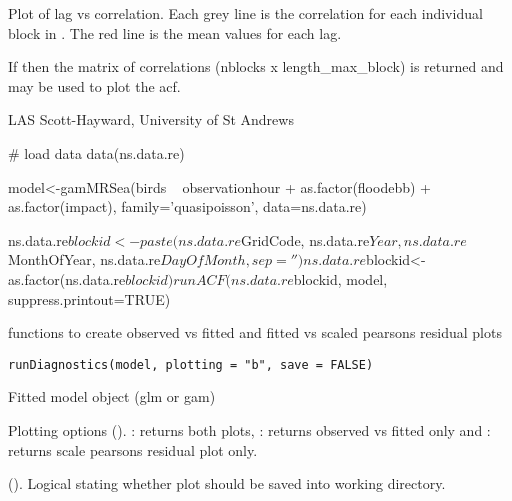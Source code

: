 \documentclass[a4paper]{book}
\begin{document}
%
\begin{Value}
Plot of lag vs correlation.  Each grey line is the correlation for each individual block in .  The red line is the mean values for each lag.

If  then the matrix of correlations (nblocks x length\_max\_block) is returned and  may be used to plot the acf.
\end{Value}
%
\begin{Author}\relax
LAS Scott-Hayward, University of St Andrews
\end{Author}
%
\begin{Examples}
\begin{ExampleCode}
# load data
data(ns.data.re)

model<-gamMRSea(birds ~ observationhour + as.factor(floodebb) + as.factor(impact), 
           family='quasipoisson', data=ns.data.re)

ns.data.re$blockid<-paste(ns.data.re$GridCode, ns.data.re$Year, ns.data.re$MonthOfYear, 
                    ns.data.re$DayOfMonth, sep='')
ns.data.re$blockid<-as.factor(ns.data.re$blockid)

runACF(ns.data.re$blockid, model, suppress.printout=TRUE)

\end{ExampleCode}
\end{Examples}
%
\begin{Description}\relax
functions to create observed vs fitted and fitted vs scaled pearsons residual plots
\end{Description}
%
\begin{Usage}
\begin{verbatim}
runDiagnostics(model, plotting = "b", save = FALSE)
\end{verbatim}
\end{Usage}
%
\begin{Arguments}
\begin{ldescription}
\item[\code{model}] Fitted model object (glm or gam)

\item[\code{plotting}] Plotting options (). : returns both plots, : returns observed vs fitted only and  : returns scale pearsons residual plot only.

\item[\code{save}] (). Logical stating whether plot should be saved into working directory.
\end{ldescription}
\end{Arguments}
\end{document}
